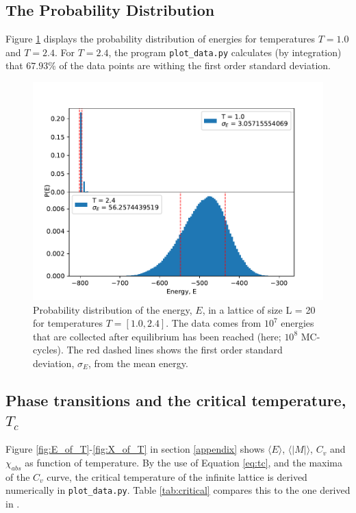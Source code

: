 \documentclass[12pt,english,a4paper]{article}
\begin{document}
\subsection{The Probability Distribution}
Figure \ref{fig:probability} displays the probability distribution of energies for temperatures $T=1.0$ and $T=2.4$. For $T=2.4$, the program \texttt{plot\_data.py} calculates (by integration) that $67.93\%$ of the data points are withing the first order standard deviation.
\begin{figure}[H]
    \centering
    \includegraphics[scale=0.7]{Code_Files/Figures/Probability_Distribution_N_1000000000_L_20.pdf}
    \caption{Probability distribution of the energy, $E$, in a lattice of size L = 20 for temperatures $T = [1.0,2.4]$. The data comes from $10^7$ energies that are collected after equilibrium has been reached (here; $10^8$ MC-cycles). The red dashed lines shows the first order standard deviation, $\sigma_E$, from the mean energy.}
    \label{fig:probability}
\end{figure}

\subsection{Phase transitions and the critical temperature, $T_c$}

Figure \ref{fig:E_of_T}-\ref{fig:X_of_T} in section \ref{appendix} shows $\langle E\rangle$, $\langle |M|\rangle$, $C_v$ and $\chi_{abs}$ as function of temperature. By the use of Equation \eqref{eq:tc}, and the maxima of the $C_v$ curve, the critical temperature of the infinite lattice is derived numerically in \texttt{plot\_data.py}. Table \ref{tab:critical} compares this to the one derived in \cite{LarsOns}. 
\end{document}
